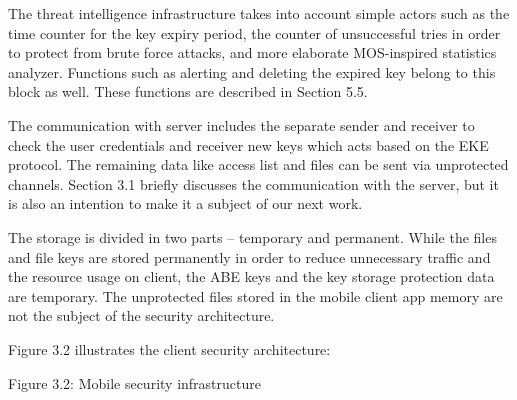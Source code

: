 \documentclass[twocolumn]{svjour3}          %
\begin{document}
The threat intelligence infrastructure takes into account simple actors such as the time counter for the key expiry period, the counter of unsuccessful tries in order to protect from brute force attacks, and more elaborate MOS-inspired statistics analyzer. Functions such as alerting and deleting the expired key belong to this block as well. These functions are described in Section 5.5.

The communication with server includes the separate sender and receiver to check the user credentials and receiver new keys which acts based on the EKE protocol. The remaining data like access list and files can be sent via unprotected channels. Section 3.1 briefly discusses the communication with the server, but it is also an intention to make it a subject of our next work.

The storage is divided in two parts – temporary and permanent. While the files and file keys are stored permanently in order to reduce unnecessary traffic and the resource usage on client, the ABE keys and the key storage protection data are temporary. The unprotected files stored in the mobile client app memory are not the subject of the security architecture.

Figure 3.2 illustrates the client security architecture:

Figure 3.2: Mobile security infrastructure
\end{document}
